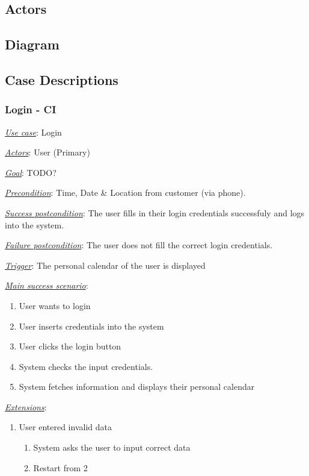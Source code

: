 \documentclass[a4paper]{article}
\begin{document}
\subsection{Actors}

\subsection{Diagram}

\subsection{Case Descriptions} %
\subsubsection{Login - CI}
\underline{\textit{Use case}}: Login

\underline{\textit{Actors}}: User (Primary)

\underline{\textit{Goal}}: TODO? %

\underline{\textit{Precondition}}: Time, Date \& Location from customer (via phone).

\underline{\textit{Success postcondition}}: The user fills in their login credentials successfuly and logs into the system.

\underline{\textit{Failure postcondition}}: The user does not fill the correct login credentials.

\underline{\textit{Trigger}}: The personal calendar of the user is displayed

\underline{\textit{Main success scenario}}: 
\begin{enumerate}[leftmargin = 3em]
    \item User wants to login
    \item User inserts credentials into the system
    \item User clicks the login button
    \item System checks the input credentials.
    \item System fetches information and displays their personal calendar
\end{enumerate} 

\underline{\textit{Extensions}}:
\begin{enumerate}[label=3\alph*, leftmargin = 3em]
    \item User entered invalid data \begin{enumerate}[label=\arabic*.]
        \item System asks the user to input correct data
        \item Restart from 2
    \end{enumerate}
\end{enumerate}
\end{document}
